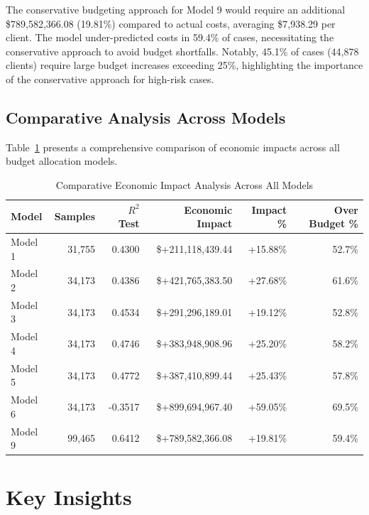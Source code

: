 The conservative budgeting approach for Model 9 would require an additional \$789,582,366.08 (19.81\%) compared to actual costs, averaging \$7,938.29 per client. The model under-predicted costs in 59.4\% of cases, necessitating the conservative approach to avoid budget shortfalls. Notably, 45.1\% of cases (44,878 clients) require large budget increases exceeding 25\%, highlighting the importance of the conservative approach for high-risk cases. 

\clearpage

\subsection{Comparative Analysis Across Models}
\label{subsec:comparative_impact}

Table~\ref{tab:all_models_impact_comparison} presents a comprehensive comparison of economic impacts across all budget allocation models.

\begin{table}[htbp]
\centering
\small
\caption{Comparative Economic Impact Analysis Across All Models}
\label{tab:all_models_impact_comparison}
\begin{tabular}{lrrrrr}
\toprule
\textbf{Model} & \textbf{Samples} & \textbf{$R^2$ Test} & \textbf{Economic Impact} & \textbf{Impact \%} & \textbf{Over Budget \%} \\
\midrule
Model 1 & 31,755 & 0.4300 & \$+211,118,439.44 & +15.88\% & 52.7\% \\
Model 2 & 34,173 & 0.4386 & \$+421,765,383.50 & +27.68\% & 61.6\% \\
Model 3 & 34,173 & 0.4534 & \$+291,296,189.01 & +19.12\% & 52.8\% \\
Model 4 & 34,173 & 0.4746 & \$+383,948,908.96 & +25.20\% & 58.2\% \\
Model 5 & 34,173 & 0.4772 & \$+387,410,899.44 & +25.43\% & 57.8\% \\
Model 6 & 34,173 & -0.3517 & \$+899,694,967.40 & +59.05\% & 69.5\% \\
Model 9 & 99,465 & 0.6412 & \$+789,582,366.08 & +19.81\% & 59.4\% \\
\bottomrule
\end{tabular}
\end{table}

\section{Key Insights}

